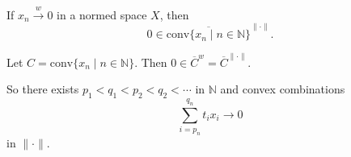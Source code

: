 \documentclass[12pt]{article}
\begin{document}
\begin{corollary}
	If $x_n \overset w\to 0$ in a normed space $X$, then
	\[
		0 \in \overline{\mathrm{conv}\{x_n \mid n \in \mathbb{N}\}}^{\|\cdot\|}.
	\]
\end{corollary}

\begin{proofbox}
	Let $C = \mathrm{conv}\{x_n \mid n \in \mathbb{N}\}$. Then $0 \in \overline{C}^w = \overline{C}^{\|\cdot\|}$.
\end{proofbox}

\begin{remark}
	So there exists $p_1 < q_1 < p_2 < q_2 < \cdots$ in $\mathbb{N}$ and convex combinations
	\[
	\sum_{i = p_n}^{q_n} t_i x_i \to 0
	\]
	in $\|\cdot\|$.
\end{remark}



\newpage

\printindex
\end{document}
